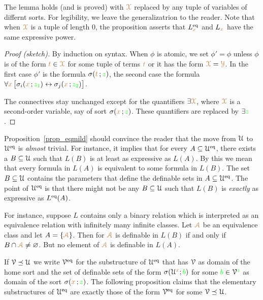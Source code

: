 The lemma holds (and is proved) with ${\color{brown}\EuScript X}$ replaced by any tuple of variables of differnt sorts. 
For legibility, we leave the generalizatrion to the reader.
Note that when ${\color{brown}\EuScript X}$ is a tuple of length $0$, the proposition asserts that $L_{{\color{brown} x}}^{{\rm eq}}$ and $L_{{\color{brown} x}}$ have the same expressive power.

\begin{proof}[Proof (sketch)]
By induction on syntax.
When $\phi$ is atomic, we set $\phi'=\phi$ unless $\phi$ is of the form ${\color{brown} t}\in {\color{brown}\EuScript X}$ for some tuple of terms ${\color{brown} t}$ or it has the form ${\color{brown}\EuScript X}={\color{brown}\EuScript Y}$.
In the first case $\phi'$ is the formula $\sigma({\color{brown} t}\,;{\color{green} z})$, the second case the formula $\forall {\color{brown}x}\,\big[\sigma_i({\color{brown} x}\,;{\color{green} z_1}) \leftrightarrow\sigma_j({\color{brown} x}\,;{\color{green} z_2})\big]$. 

The connectives stay unchanged except for the quantifiers $\exists {\color{brown}\EuScript X}$, where ${\color{brown}\EuScript X}$ is a second-order variable, say of sort $\sigma({\color{brown} x}\,;{\color{green} z})$.
These quantifiers are replaced by $\exists{\color{green}z}$.
\end{proof}



\begin{remark}\label{rem_eqmild}
Proposition~\ref{prop_eqmild} should convince the reader that the move from $\EuScript U$ to $\EuScript U^{{\rm eq}}$ is \textit{almost\/} trivial.
For instance, it implies that for every $A\subseteq\EuScript U^{{\rm eq}}$, there exists a $B\subseteq\EuScript U$ such that $L(B)$ is at least as expressive as $L(A)$.
By this we mean that every formula in $L(A)$ is equivalent to some formula in $L(B)$.
The set $B\subseteq\EuScript U$ contains the parameters that define the definable sets in $A\subseteq\EuScript U^{{\rm eq}}$.
The point of $\EuScript U^{{\rm eq}}$ is that there might not be any $B\subseteq\EuScript U$ such that $L(B)$ is \textit{exactly\/} as expressive as $L^{{\rm eq}}(A)$.

For instance, suppose $L$ contains only a binary relation which is interpreted as an equivalence relation with infinitely many infinite classes.
Let ${\color{brown}\EuScript A}$ be an equivalence class and let $A=\{{\color{brown}\EuScript A}\}$.
Then for ${\color{brown}\EuScript A}$ is definable in $L(B)$ if and only if $B\cap {\color{brown}\EuScript A}\neq\varnothing$.
But no element of ${\color{brown}\EuScript A}$ is definable in $L(A)$.
\end{remark}

If $\EuScript V\preceq\EuScript U$ we write \emph{$\EuScript V^{{{\rm eq}}}$\/} for the substructure of $\EuScript U^{{\rm eq}}$ that has $\EuScript V$ as domain of the home sort and  the set of definable sets of the form $\sigma(\EuScript U^{\color{brown} x};{\color{green} b})$ for some ${\color{green} b}\in \EuScript V^{\color{green} z}$ as domain of the sort $\sigma({\color{brown} x}\,;{\color{green} z})$.
The following proposition claims that the elementary substructures of $\EuScript U^{{\rm eq}}$ are exactly those of the form $\EuScript V^{{\rm eq}}$ for some $\EuScript V\preceq\EuScript U$.

